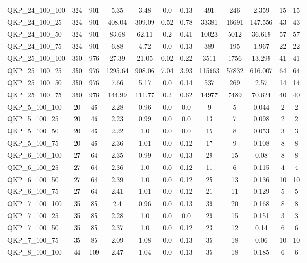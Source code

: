 \begin{table}[!h]
{\begin{tabular}{lccccccccccc}
QKP\_24\_100\_100 & 324 & 901 & 5.35 & 3.48 & 0.0 & 0.13 & 491 & 246 & 2.359 & 15 & 15\\
QKP\_24\_100\_25 & 324 & 901 & 408.04 & 309.09 & 0.52 & 0.78 & 33381 & 16691 & 147.556 & 43 & 43\\
QKP\_24\_100\_50 & 324 & 901 & 83.68 & 62.11 & 0.2 & 0.41 & 10023 & 5012 & 36.619 & 57 & 57\\
QKP\_24\_100\_75 & 324 & 901 & 6.88 & 4.72 & 0.0 & 0.13 & 389 & 195 & 1.967 & 22 & 22\\
QKP\_25\_100\_100 & 350 & 976 & 27.39 & 21.05 & 0.02 & 0.22 & 3511 & 1756 & 13.299 & 41 & 41\\
QKP\_25\_100\_25 & 350 & 976 & 1295.64 & 908.06 & 7.04 & 3.93 & 115663 & 57832 & 616.007 & 64 & 64\\
QKP\_25\_100\_50 & 350 & 976 & 7.66 & 5.17 & 0.0 & 0.14 & 537 & 269 & 2.57 & 14 & 14\\
QKP\_25\_100\_75 & 350 & 976 & 144.99 & 111.77 & 0.2 & 0.62 & 14977 & 7489 & 70.624 & 40 & 40\\
QKP\_5\_100\_100 & 20 & 46 & 2.28 & 0.96 & 0.0 & 0.0 & 9 & 5 & 0.044 & 2 & 2\\
QKP\_5\_100\_25 & 20 & 46 & 2.23 & 0.99 & 0.0 & 0.0 & 13 & 7 & 0.098 & 2 & 2\\
QKP\_5\_100\_50 & 20 & 46 & 2.22 & 1.0 & 0.0 & 0.0 & 15 & 8 & 0.053 & 3 & 3\\
QKP\_5\_100\_75 & 20 & 46 & 2.36 & 1.01 & 0.0 & 0.12 & 17 & 9 & 0.108 & 8 & 8\\
QKP\_6\_100\_100 & 27 & 64 & 2.35 & 0.99 & 0.0 & 0.13 & 29 & 15 & 0.08 & 8 & 8\\
QKP\_6\_100\_25 & 27 & 64 & 2.36 & 1.0 & 0.0 & 0.12 & 11 & 6 & 0.115 & 4 & 4\\
QKP\_6\_100\_50 & 27 & 64 & 2.39 & 1.0 & 0.0 & 0.12 & 25 & 13 & 0.136 & 10 & 10\\
QKP\_6\_100\_75 & 27 & 64 & 2.41 & 1.01 & 0.0 & 0.12 & 21 & 11 & 0.129 & 5 & 5\\
QKP\_7\_100\_100 & 35 & 85 & 2.4 & 0.96 & 0.0 & 0.13 & 39 & 20 & 0.168 & 8 & 8\\
QKP\_7\_100\_25 & 35 & 85 & 2.28 & 1.0 & 0.0 & 0.0 & 29 & 15 & 0.151 & 3 & 3\\
QKP\_7\_100\_50 & 35 & 85 & 2.37 & 1.0 & 0.0 & 0.12 & 23 & 12 & 0.14 & 6 & 6\\
QKP\_7\_100\_75 & 35 & 85 & 2.09 & 1.08 & 0.0 & 0.13 & 35 & 18 & 0.06 & 10 & 10\\
QKP\_8\_100\_100 & 44 & 109 & 2.47 & 1.04 & 0.0 & 0.13 & 35 & 18 & 0.185 & 6 & 6\\

\end{tabular}}
\end{table}
